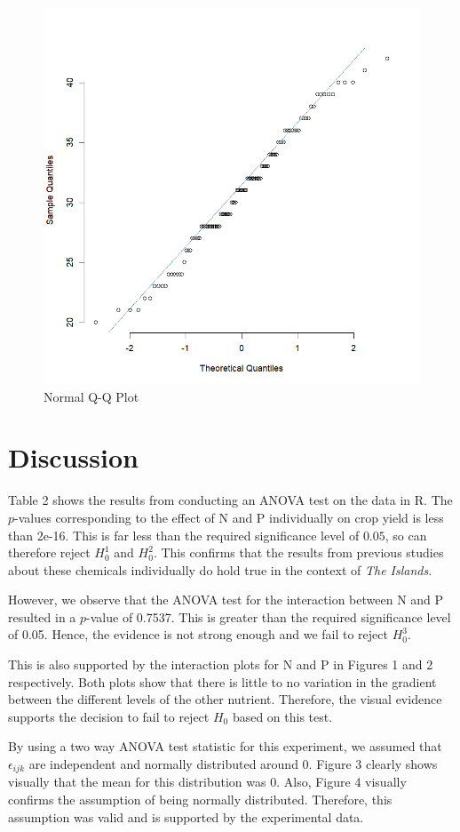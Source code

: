 \documentclass[12pt]{article}
\begin{document}
\begin{figure}[ht]
    \centering
    \includegraphics[width=0.8\linewidth]{Figures/Q-Q Plot.png}
    \caption{Normal Q-Q Plot}
\end{figure}


\section{Discussion}

Table 2 shows the results from conducting an ANOVA test on the data in R.
The $p$-values corresponding to the effect of N and P individually on crop yield is less than 2e-16.
This is far less than the required significance level of $0.05$, so can therefore reject $H^1_0$ and $H^2_0$.
This confirms that the results from previous studies about these chemicals individually do hold true in the context of \textit{The Islands}.

However, we observe that the ANOVA test for the interaction between N and P resulted in a $p$-value of 0.7537.
This is greater than the required significance level of 0.05.
Hence, the evidence is not strong enough and we fail to reject $H^3_0$.

This is also supported by the interaction plots for N and P in Figures 1 and 2 respectively.
Both plots show that there is little to no variation in the gradient between the different levels of the other nutrient.
Therefore, the visual evidence supports the decision to fail to reject $H_0$ based on this test.

By using a two way ANOVA test statistic for this experiment, we assumed that
$\epsilon_{ijk}$ are independent and normally distributed around 0.
Figure 3 clearly shows visually that the mean for this distribution was 0.
Also, Figure 4 visually confirms the assumption of being normally distributed. Therefore, this assumption was valid and is supported by the experimental data.
\end{document}

